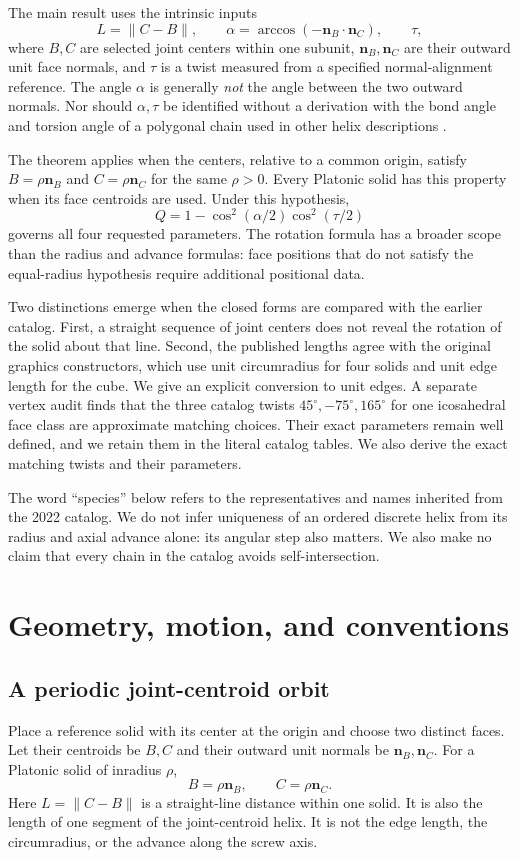 \documentclass[11pt]{article}
\theoremstyle{definition}
\newcommand{\nb}{\mathbf n_B}
\newcommand{\nc}{\mathbf n_C}
\newcommand{\degc}{^{\circ}}
\begin{document}
The main result uses the intrinsic inputs
\[
 L=\|C-B\|,\qquad
 \alpha=\arccos(-\nb\cdot\nc),\qquad \tau,
\]
where $B,C$ are selected joint centers within one subunit, $\nb,\nc$ are their
outward unit face normals, and $\tau$ is a twist measured from a specified
normal-alignment reference. The angle $\alpha$ is generally \emph{not} the
angle between the two outward normals. Nor should $\alpha,\tau$ be identified
without a derivation with the bond angle and torsion angle of a polygonal
chain used in other helix descriptions \cite{dauter2018}.

The theorem applies when the centers, relative to a common origin, satisfy
$B=\rho\nb$ and $C=\rho\nc$ for the same $\rho>0$. Every Platonic solid has
this property when its face centroids are used. Under this hypothesis,
\[
 Q=1-\cos^2(\alpha/2)\cos^2(\tau/2)
\]
governs all four requested parameters. The rotation formula has a broader
scope than the radius and advance formulas: face positions that do not
satisfy the equal-radius hypothesis require additional positional data.

Two distinctions emerge when the closed forms are compared with the earlier
catalog. First, a straight sequence of joint centers does not reveal the
rotation of the solid about that line. Second, the published lengths agree
with the original graphics constructors, which use unit circumradius for
four solids and unit edge length for the cube. We give an explicit conversion
to unit edges. A separate vertex audit finds that the three catalog twists
$45\degc,-75\degc,165\degc$ for one icosahedral face class are approximate
matching choices. Their exact parameters remain well defined, and we retain
them in the literal catalog tables. We also derive the exact matching twists
and their parameters.

The word ``species'' below refers to the representatives and names inherited
from the 2022 catalog. We do not infer uniqueness of an ordered discrete helix
from its radius and axial advance alone: its angular step also matters. We
also make no claim that every chain in the catalog avoids self-intersection.

\section{Geometry, motion, and conventions}\label{sec:setup}
\subsection{A periodic joint-centroid orbit}
Place a reference solid with its center at the origin and choose two distinct
faces. Let their centroids be $B,C$ and their outward unit normals be
$\nb,\nc$. For a Platonic solid of inradius $\rho$,
\begin{equation}\label{eq:centered}
 B=\rho\nb,\qquad C=\rho\nc.
\end{equation}
Here $L=\|C-B\|$ is a straight-line distance within one solid. It is also the
length of one segment of the joint-centroid helix. It is not the edge length,
the circumradius, or the advance along the screw axis.
\end{document}
